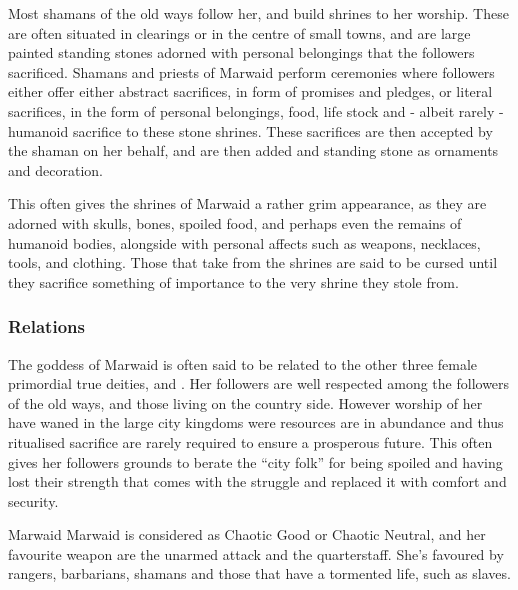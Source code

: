 Most shamans of the old ways follow her, and build shrines to her worship.
These are often situated in clearings or in the centre of small towns, and are
large painted standing stones adorned with personal belongings that the
followers sacrificed. Shamans and priests of Marwaid perform ceremonies where
followers either offer either abstract sacrifices, in form of promises and
pledges, or literal sacrifices, in the form of personal belongings, food, life
stock and - albeit rarely - humanoid sacrifice to these stone shrines. These
sacrifices are then accepted by the shaman on her behalf, and are then added
and standing stone as ornaments and decoration.

This often gives the shrines of Marwaid a rather grim appearance, as they are
adorned with skulls, bones, spoiled food, and perhaps even the remains of
humanoid bodies, alongside with personal affects such as weapons, necklaces,
tools, and clothing. Those that take from the shrines are said to be cursed
until they sacrifice something of importance to the very shrine they stole
from.

\subsubsection{Relations}

The goddess of Marwaid is often said to be related to the other three
female primordial true deities,  and .
Her followers are well respected among the followers of the old ways, and
those living on the country side. However worship of her have waned in the
large city kingdoms were resources are in abundance and thus ritualised
sacrifice are rarely required to ensure a prosperous future. This often gives
her followers grounds to berate the ``city folk'' for being spoiled and having
lost their strength that comes with the struggle and replaced it with comfort
and security.

\begin{35e}{Marwaid}
  Marwaid is considered as Chaotic Good or Chaotic Neutral, and her favourite
  weapon are the unarmed attack and the quarterstaff. She's favoured by rangers,
  barbarians, shamans and those that have a tormented life, such as slaves.
\end{35e}
